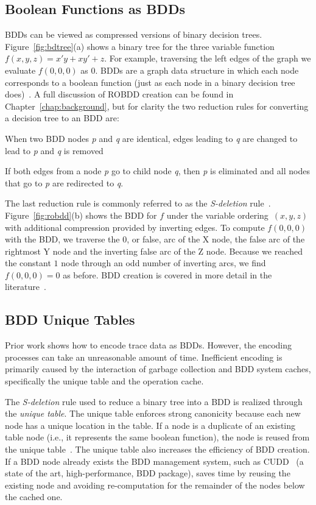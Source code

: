 {\subsection{Boolean Functions as BDDs}

BDDs can be viewed as compressed versions of binary decision trees. Figure~\ref{fig:bdtree}(a) shows a binary tree for the three variable function $f(x,y,z) = x'y + xy' + z$.  For example, traversing the left edges of the graph we evaluate $f(0,0,0)$ as $0$.  BDDs are a graph data structure in which each node corresponds to a boolean function (just as each node in a binary decision tree does)~\cite{bryant:86:ieeetc}. A full discussion of ROBDD creation can be found in Chapter~\ref{chap:background}, but for clarity the two reduction rules for converting a decision tree to an BDD are:

 When two BDD nodes \textit{p} and \textit{q} are identical, edges
 leading to \textit{q} are changed to lead to \textit{p} and \textit{q} is removed

 If both edges from a node \textit{p} go to
 child node \textit {q}, then \textit{p} is eliminated and all nodes that go to \textit{p} are redirected to \textit{q}.

The last reduction rule is commonly referred to as the \textit{S-deletion} rule~\cite{minato:01:STTT}. Figure~\ref{fig:robdd}(b) shows the BDD for $f$ under the variable ordering~$(x,y,z)$ with additional compression provided by inverting edges. To compute $f(0,0,0)$ with the BDD, we traverse the $0$, or false, arc of the X node, the false arc of the rightmost Y node and the inverting false arc of the Z node. Because we reached the constant $1$ node through an odd number of inverting arcs, we find $f(0,0,0)=0$ as before. BDD creation is covered in more detail in the literature~\cite{somenzi:09:cu,bryant:86:ieeetc,price:06:cal}.

\subsection{BDD Unique Tables}

Prior work shows how to encode trace data as BDDs.  However, the encoding processes can take an unreasonable amount of time. Inefficient encoding is primarily caused by the interaction of garbage collection and BDD system caches, specifically the unique table and the operation cache.

The \textit{S-deletion} rule used to reduce a binary tree into a BDD is realized through the \textit{unique table}.  The unique table enforces strong canonicity because each new node has a unique location in the table.  If a node is a duplicate of an existing table node (i.e., it represents the same boolean function), the node is reused from the unique table~\cite{bryant:86:ieeetc}. The unique table also increases the efficiency of BDD creation.  If a BDD node already exists the BDD management system, such as CUDD~\cite{somenzi:09:cu} (a state of the art, high-performance, BDD package), saves time by reusing the existing node and avoiding re-computation for the remainder of the nodes below the cached one.

}
